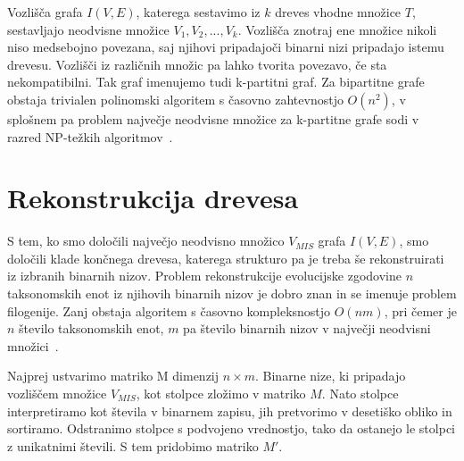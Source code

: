 \documentclass[a4paper, 12pt]{book}
\begin{document}
Vozlišča grafa $I(V, E)$, katerega sestavimo iz $k$ dreves vhodne množice $T$, 
sestavljajo neodvisne množice $V_1, V_2, ..., V_k$. Vozlišča znotraj ene množice
nikoli niso medsebojno povezana, saj njihovi pripadajoči binarni nizi pripadajo 
istemu drevesu. Vozlišči iz različnih množic pa lahko tvorita povezavo, če
sta nekompatibilni. Tak graf imenujemo tudi k-partitni graf. Za bipartitne grafe 
obstaja trivialen polinomski algoritem s časovno zahtevnostjo $O(n^2)$, v splošnem 
pa problem največje neodvisne množice za k-partitne grafe sodi v razred 
NP-težkih algoritmov~\cite{pw}. 

\section{Rekonstrukcija drevesa}
S tem, ko smo določili največjo neodvisno množico $V_{MIS}$ grafa $I(V, E)$, 
smo določili klade končnega drevesa, katerega strukturo pa je treba še 
rekonstruirati iz izbranih binarnih nizov. Problem rekonstrukcije evolucijske 
zgodovine $n$ taksonomskih enot iz njihovih binarnih nizov je dobro znan in se 
imenuje problem filogenije. Zanj obstaja algoritem s časovno kompleksnostjo $O(nm)$, 
pri čemer je $n$ število taksonomskih enot, $m$ pa število binarnih nizov v največji
 neodvisni množici~\cite{gd}.

Najprej ustvarimo matriko M dimenzij $n×m$. Binarne nize, ki pripadajo vozliščem 
množice $V_{MIS}$, kot stolpce zložimo v matriko $M$. Nato stolpce interpretiramo 
kot števila v binarnem zapisu, jih pretvorimo v desetiško obliko in sortiramo. 
Odstranimo stolpce s podvojeno vrednostjo, tako da ostanejo le stolpci z unikatnimi 
števili. S tem pridobimo matriko $M'$.
\end{document}
